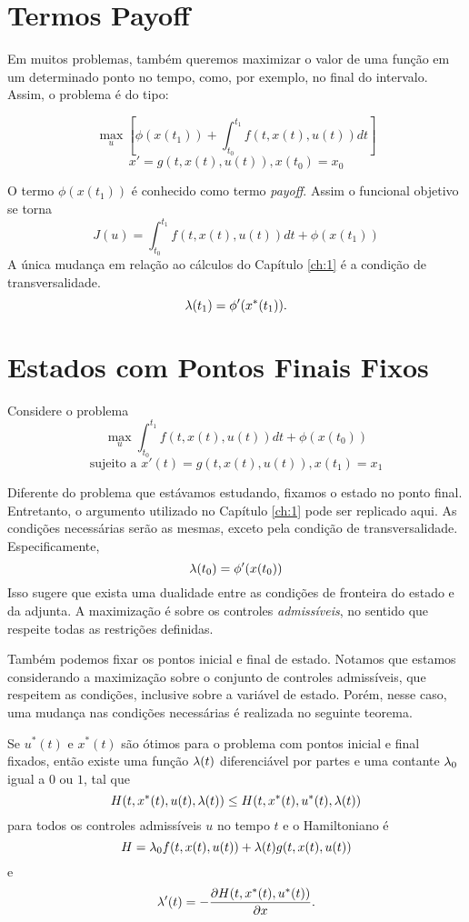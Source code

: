 \section{Termos Payoff}

Em muitos problemas, também queremos maximizar o valor de uma função em um
determinado ponto no tempo, como, por exemplo, no final do intervalo. Assim, o
problema é do tipo: 

\begin{equation*}
    \max_u \left[\phi(x(t_1)) + \int_{t_0}^{t_1} f(t, x(t),u(t))dt\right] 
\end{equation*}
\begin{equation*}
    x' = g(t,x(t),u(t)), x(t_0) = x_0
\end{equation*}

O termo $\phi(x(t_1))$ é conhecido como termo \textit{payoff}. Assim o
funcional objetivo se torna 
$$
J(u) = \int_{t_0}^{t_1} f(t,x(t),u(t))dt + \phi(x(t_1))
$$
A única mudança em relação ao cálculos do Capítulo \ref{ch:1} é a condição de transversalidade. 
$$\lambda(t_1) = \phi '(x^*(t_1)).$$ 

\section{Estados com Pontos Finais Fixos}

Considere o problema  
$$
\max_u \int_{t_0}^{t_1} f(t,x(t), u(t)) dt + \phi(x(t_0)) 
$$
$$
\text{sujeito a  }x'(t) = g(t,x(t),u(t)), x(t_1) = x_1
$$

Diferente do problema que estávamos estudando, fixamos o estado no ponto
final. Entretanto, o argumento utilizado no Capítulo \ref{ch:1} pode ser
replicado aqui. As condições necessárias serão as mesmas, exceto pela
condição de transversalidade. Especificamente, 
$$
\lambda(t_0) = \phi '(x(t_0))
$$
Isso sugere que exista uma dualidade entre as condições de fronteira do estado
e da adjunta. A maximização é sobre os controles \textit{admissíveis}, no
sentido que respeite todas as restrições definidas. 

Também podemos fixar os pontos inicial e final de estado. Notamos que estamos
considerando a maximização sobre o conjunto de controles admissíveis, que
respeitem as condições, inclusive sobre a variável de estado. Porém, nesse
caso, uma mudança nas condições necessárias é realizada no seguinte teorema. 

\begin{theorem}
    Se $u^*(t)$ e $x^*(t)$ são ótimos para o problema com pontos inicial e
    final fixados, então existe uma função $\lambda(t)$ diferenciável por partes e
    uma contante $\lambda_0$ igual a $0$ ou $1$, tal que 
    $$
    H(t,x^*(t),u(t),\lambda(t)) \le H(t,x^*(t),u^*(t), \lambda(t))
    $$
    para todos os controles admissíveis $u$ no tempo $t$ e o Hamiltoniano é 
    $$H = \lambda_0f(t,x(t),u(t)) + \lambda(t)g(t,x(t),u(t))$$ e
    $$\lambda '(t) = - \dfrac{\partial H(t,x^*(t), u^*(t))}{\partial x}.$$ 
\end{theorem}

